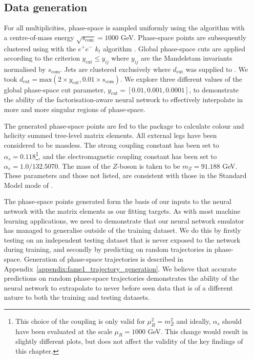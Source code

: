 \documentclass[main.tex]{subfiles}
\begin{document}
\subsection{Data generation}\label{sec:data}
For all multiplicities, phase-space is sampled uniformly using the {\RAMBO} algorithm \cite{Kleiss:1985gy} with a centre-of-mass energy $\sqrt{s_{\mathrm{com}}} = 1000$ GeV.
Phase-space points are subsequently clustered using {\FastJet} \cite{Cacciari:2011ma,noel_dawe_2021_4446849} with the $e^{+}e^{-}$ $k_{t}$ algorithm \cite{Catani:1991hj}.
Global phase-space cuts are applied according to the criterion $y_{\mathrm{cut}} \leq y_{ij}$ where $y_{ij}$ are the Mandelstam invariants normalised by $s_{\mathrm{com}}$.
Jets are clustered exclusively where $d_{\mathrm{cut}}$ was supplied to {\FastJet}. We took $d_{\mathrm{cut}} = \mathrm{max}(2 \times y_{\mathrm{cut}}, 0.01 \times s_{\mathrm{com}})$.
We explore three different values of the global phase-space cut parameter, $y_{\mathrm{cut}} = [0.01, 0.001, 0.0001]$, to demonstrate the ability of the factorisation-aware neural network to effectively interpolate in more and more singular regions of phase-space.

The generated phase-space points are fed to the {\NJet} package \cite{Badger:2012pg} to calculate colour and helicity summed tree-level matrix elements. 
All external legs have been considered to be massless. 
The strong coupling constant has been set to $\alpha_{s} = 0.118$\footnote{This choice of
the coupling is only valid for $\mu_{R}^{2} = m_{Z}^{2}$ and ideally,
$\alpha_{s}$ should have been evaluated at the scale $\mu_{R} = 1000$ GeV. This change would result
in slightly different plots, but does not affect the validity of the key findings
of this chapter.}, and the electromagnetic coupling constant has been set to $\alpha_{e} = 1.0 / 132.5070$.
The mass of the $Z$-boson is taken to be $m_{Z} = 91.188$ GeV.
These parameters and those not listed, are consistent with those in the Standard Model mode of \aNLO \cite{Alwall:2014hca}.

The phase-space points generated form the basis of our inputs to the neural network with the matrix elements as our fitting targets.
As with most machine learning applications, we need to demonstrate that our neural network emulator has managed to generalise outside of the training dataset.
We do this by firstly testing on an independent testing dataset that is never exposed to the network during training, and secondly by predicting on random trajectories in phase-space.
Generation of phase-space trajectories is described in Appendix~\ref{appendix:fame1_trajectory_generation}.
We believe that accurate predictions on random phase-space trajectories demonstrates the ability of the neural network to extrapolate to never before seen data 
that is of a different nature to both the training and testing datasets.
\end{document}
